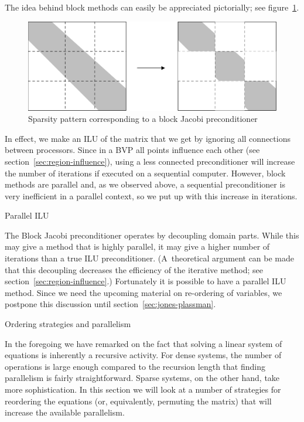 The idea behind block methods can easily be appreciated pictorially;
see figure~\ref{fig:block-method}.
\begin{figure}[ht]
  \includegraphics[scale=.12]{graphics/block-jacobi}
  \caption{Sparsity pattern corresponding to a block Jacobi
    preconditioner}
  \label{fig:block-method}
\end{figure}
In effect, we make an \ac{ILU} of the matrix that we get by ignoring
all connections between processors. Since in a \ac{BVP} all points
influence each other (see section~\ref{sec:region-influence}), using a
less connected preconditioner will increase the number of iterations
if executed on a sequential computer. However, block methods are
parallel and, as we observed above, a sequential preconditioner is
very inefficient in a parallel context, so we put up with this
increase in iterations.


 {Parallel ILU}
\label{sec:parallel-ilu}

The Block Jacobi preconditioner operates by decoupling domain
parts. While this may give a method that is highly parallel, it may
give a higher number of iterations than a true \ac{ILU}
preconditioner. (A~theoretical argument can be made that this
decoupling decreases the efficiency of the iterative method; see
section~\ref{sec:region-influence}.) Fortunately it is possible to
have a parallel \ac{ILU} method. Since we need the upcoming
material on re-ordering of variables, we postpone this discussion
until section~\ref{sec:jones-plassman}.

 {Ordering strategies and parallelism}
\label{sec:ordering}

In the foregoing we have remarked on the fact that solving
a linear system of equations is inherently a recursive activity.
For dense systems, the number of operations is large enough
compared to the recursion length that finding parallelism 
is fairly straightforward. Sparse systems, on the other hand,
take more sophistication. In this section we will look at 
a number of strategies for reordering the equations (or, equivalently,
permuting the matrix) that will increase the available parallelism.

